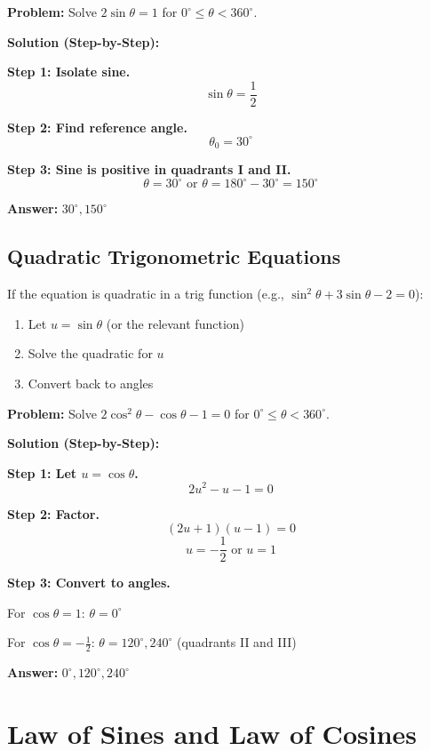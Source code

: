 \documentclass[12pt]{extarticle}
\begin{document}
\begin{examplebox}
\textbf{Problem:} Solve $2\sin\theta = 1$ for $0^\circ \le \theta < 360^\circ$.

\textbf{Solution (Step-by-Step):}

\textbf{Step 1: Isolate sine.}
\[
\sin\theta = \frac{1}{2}
\]

\textbf{Step 2: Find reference angle.}
\[
\theta_0 = 30^\circ
\]

\textbf{Step 3: Sine is positive in quadrants I and II.}
\[
\theta = 30^\circ \text{ or } \theta = 180^\circ - 30^\circ = 150^\circ
\]

\textbf{Answer:} $\boxed{30^\circ, 150^\circ}$
\end{examplebox}

\subsection{Quadratic Trigonometric Equations}

\begin{conceptbox}[Strategy]
If the equation is quadratic in a trig function (e.g., $\sin^2\theta + 3\sin\theta - 2 = 0$):
\begin{enumerate}
\item Let $u = \sin\theta$ (or the relevant function)
\item Solve the quadratic for $u$
\item Convert back to angles
\end{enumerate}
\end{conceptbox}

\begin{examplebox}
\textbf{Problem:} Solve $2\cos^2\theta - \cos\theta - 1 = 0$ for $0^\circ \le \theta < 360^\circ$.

\textbf{Solution (Step-by-Step):}

\textbf{Step 1: Let $u = \cos\theta$.}
\[
2u^2 - u - 1 = 0
\]

\textbf{Step 2: Factor.}
\[
(2u + 1)(u - 1) = 0
\]
\[
u = -\frac{1}{2} \text{ or } u = 1
\]

\textbf{Step 3: Convert to angles.}

For $\cos\theta = 1$: $\theta = 0^\circ$

For $\cos\theta = -\frac{1}{2}$: $\theta = 120^\circ, 240^\circ$ (quadrants II and III)

\textbf{Answer:} $\boxed{0^\circ, 120^\circ, 240^\circ}$
\end{examplebox}

\section{Law of Sines and Law of Cosines}
\end{document}
